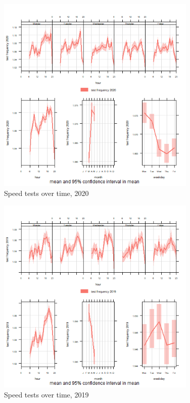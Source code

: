 \documentclass[]{interact}
\theoremstyle{plain}%
\theoremstyle{definition}
\theoremstyle{remark}
\begin{document}
\begin{figure}
\centering
\includegraphics[width=0.85\textwidth,height=0.5\textheight]{figures/time.var.plot2020.png}
\caption{Speed tests over time, 2020 \label{test2020}}
\end{figure}

\begin{figure}
\centering
\includegraphics[width=0.85\textwidth,height=0.5\textheight]{figures/time.var.plot2019.png}
\caption{Speed tests over time, 2019 \label{test2019}}
\end{figure}
\end{document}

